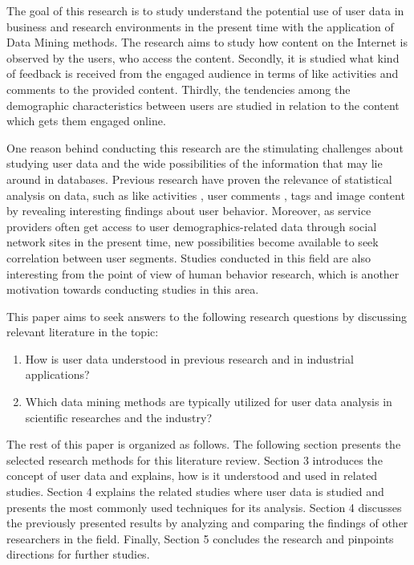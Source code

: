 \documentclass[conference]{IEEEtran}
\begin{document}
 The goal of this research is to study understand the potential use of user data in business and research environments in the present time with the application of Data Mining methods. The research aims to study how content on the Internet is observed by the users, who access the content. Secondly, it is studied what kind of feedback is received from the engaged audience in terms of like activities and comments to the provided content. Thirdly, the tendencies among the demographic characteristics between users are studied in relation to the content which gets them engaged online. 

 One reason behind conducting this research are the stimulating challenges about studying user data and the wide possibilities of the information that may lie around in databases. Previous research have proven the relevance of statistical analysis on data, such as like activities \cite{jang2015noreciprocity, jang2016teensengagemorewithfewerphotos, ottoni2013ladies, guy2016whatsyourorganizationlike, jang2015no}, user comments \cite{jang2016teensengagemorewithfewerphotos}, tags \cite{jang2016teensengagemorewithfewerphotos} and image content \cite{hu2014we, bakhshi2014faces} by revealing interesting findings about user behavior. Moreover, as service providers often get access to user demographics-related data through social network sites in the present time, new possibilities become available to seek correlation between user segments. Studies conducted in this field are also interesting from the point of view of human behavior research, which is another motivation towards conducting studies in this area.

This paper aims to seek answers to the following research questions by discussing relevant literature in the topic: 

\setdefaultleftmargin{40pt}{}{}{}{}{}
\begin{enumerate}[label=RQ\arabic*:]
	\item How is user data understood in previous research and in industrial applications?
	\item Which data mining methods are typically utilized for user data analysis in scientific researches and the industry?
\end{enumerate}  

The rest of this paper is organized as follows. The following section presents the selected research methods for this literature review. Section 3 introduces the concept of user data and explains, how is it understood and used in related studies. Section 4 explains the related studies where user data is studied and presents the most commonly used techniques for its analysis. Section 4 discusses the previously presented results by analyzing and comparing the findings of other researchers in the field. Finally, Section 5 concludes the research and pinpoints directions for further studies. 
\end{document}
